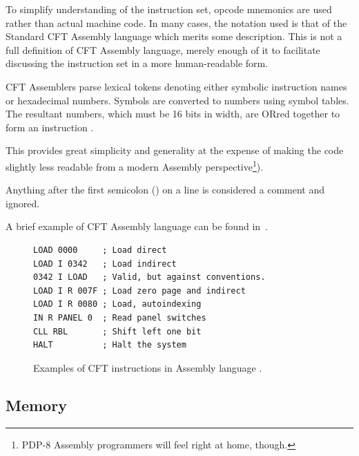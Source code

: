To simplify understanding of the instruction set, opcode mnemonics are
used rather than actual machine code. In many cases, the notation used
is that of the Standard CFT Assembly language which merits some
description. This is not a full definition of CFT Assembly language,
merely enough of it to facilitate discussing the instruction set in
a more human-readable form.

CFT Assemblers parse lexical tokens denoting either symbolic
instruction names or hexadecimal numbers. Symbols are converted to
numbers using symbol tables. The resultant numbers, which must be 16
bits in width, are ORred together to form an instruction%
.

This provides great simplicity and generality at the expense of making
the code slightly less readable from a modern Assembly
perspective\footnote{PDP-8 Assembly programmers will feel right at
  home, though.}).

Anything after the first semicolon (\asm{;}) on a line is considered a comment
and ignored.

A brief example of CFT Assembly language can be found in~.

\begin{figure}
\small
\begin{lstlisting}[language=cftasm]
LOAD 0000     ; Load direct
LOAD I 0342   ; Load indirect
0342 I LOAD   ; Valid, but against conventions.
LOAD I R 007F ; Load zero page and indirect
LOAD I R 0080 ; Load, autoindexing
IN R PANEL 0  ; Read panel switches
CLL RBL       ; Shift left one bit
HALT          ; Halt the system
\end{lstlisting}
\caption{\label{fig-asm}Examples of CFT instructions in Assembly language .}
\end{figure}

\subsection{Memory}

